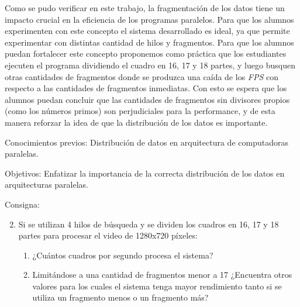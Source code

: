 Como se pudo verificar en este trabajo, la fragmentación de los datos tiene un
impacto crucial en la eficiencia de los programas paralelos. Para que los
alumnos experimenten con este concepto el sistema desarrollado es ideal, ya que
permite experimentar con distintas cantidad de hilos y fragmentos. Para que los
alumnos puedan fortalecer este concepto proponemos como práctica que los
estudiantes ejecuten el programa dividiendo el cuadro en 16, 17 y 18 partes, y
luego busquen otras cantidades de fragmentos donde se produzca una caída de los
\emph{FPS} con respecto a las cantidades de fragmentos inmediatas. Con esto se
espera que los alumnos puedan concluir que las cantidades de fragmentos sin
divisores propios (como los números primos) son perjudiciales para la
performance, y de esta manera reforzar la idea de que la distribución de los
datos es importante.

\begin{description}

	\item{Conocimientos previos}: Distribución de datos en arquitectura de
		computadoras paralelas.

	\item{Objetivos}: Enfatizar la importancia de la correcta distribución
		de los datos en arquitecturas paralelas.

	\item{Consigna}: \begin{enumerate}
	
	\setcounter{enumi}{1}

	\item{Si se utilizan 4 hilos de búsqueda y se dividen los cuadros en 16,
		17 y 18 partes para procesar el video de 1280x720 píxeles:

\begin{enumerate}

	\item{¿Cuántos cuadros por segundo procesa el sistema?}

	\item{Limitándose a una cantidad de fragmentos menor a 17 ¿Encuentra
		otros valores para los cuales el sistema tenga mayor rendimiento
		tanto si se utiliza un fragmento menos o un fragmento más?}

\end{enumerate}}

\end{enumerate}

\end{description}

